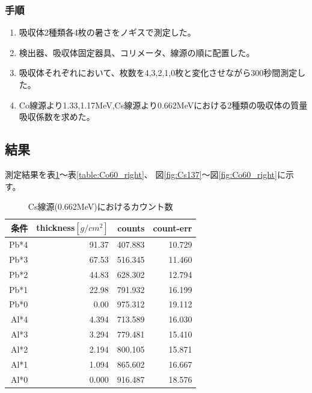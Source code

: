 \documentclass[a4paper,12pt]{jarticle}
\begin{document}
  \subsubsection{手順}
   \begin{enumerate}
    \item 吸収体2種類各4枚の暑さをノギスで測定した。
    \item 検出器、吸収体固定器具、コリメータ、線源の順に配置した。
    \item 吸収体それぞれにおいて、枚数を4,3,2,1,0枚と変化させながら300秒間測定した。
    \item Co線源より1.33,1.17MeV,Cs線源より0.662MeVにおける2種類の吸収体の質量吸収係数を求めた。
   \end{enumerate}


 \subsection{結果}
  測定結果を表\ref{table:Cs137}〜表\ref{table:Co60_right}、
  図\ref{fig:Cs137}〜図\ref{fig:Co60_right}に示す。
  \begin{table}[htbp]
   \begin{center}

       \caption{Cs線源(0.662MeV)におけるカウント数}
        \begin{tabular}{|r|r|r|r|}
         \hline
         条件 & thickness$[g/cm^2]$ & counts & count-err \\
         \hline
         \hline
         Pb*4 & 91.37  & 407.883  & 10.729  \\
         Pb*3 & 67.53  & 516.345  & 11.460  \\
         Pb*2 & 44.83  & 628.302  & 12.794  \\
         Pb*1 & 22.98  & 791.932  & 16.199  \\
         Pb*0 & 0.00  & 975.312  & 19.112  \\
         \hline
         Al*4 & 4.394  & 713.589  & 16.030  \\
         Al*3 & 3.294  & 779.481  & 15.410  \\
         Al*2 & 2.194  & 800.105  & 15.871  \\
         Al*1 & 1.094  & 865.602  & 16.667  \\
         Al*0 & 0.000  & 916.487  & 18.576  \\
         \hline
        \end{tabular}
       \label{table:Cs137}

   \end{center}
  \end{table}
\end{document}
